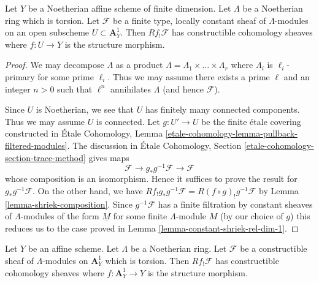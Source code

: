 \begin{lemma}
\label{lemma-loc-constant-shriek-rel-dim-1}
Let $Y$ be a Noetherian affine scheme of finite dimension.
Let $\Lambda$ be a Noetherian ring which is torsion.
Let $\mathcal{F}$ be a finite type, locally constant sheaf of
$\Lambda$-modules on an open subscheme $U \subset \mathbf{A}^1_Y$.
Then $Rf_!\mathcal{F}$ has constructible cohomology sheaves where
$f : U \to Y$ is the structure morphism.
\end{lemma}

\begin{proof}
We may decompose $\Lambda$ as a product
$\Lambda = \Lambda_1 \times \ldots \times \Lambda_r$
where $\Lambda_i$ is $\ell_i$-primary for some prime $\ell_i$.
Thus we may assume there exists a prime $\ell$ and an integer $n > 0$
such that $\ell^n$ annihilates $\Lambda$ (and hence $\mathcal{F}$).

\medskip\noindent
Since $U$ is Noetherian, we see that $U$ has finitely many connected
components. Thus we may assume $U$ is connected.
Let $g : U' \to U$ be the finite \'etale covering
constructed in \'Etale Cohomology, Lemma
\ref{etale-cohomology-lemma-pullback-filtered-modules}.
The discussion in
\'Etale Cohomology, Section \ref{etale-cohomology-section-trace-method}
gives maps
$$
\mathcal{F} \to g_*g^{-1}\mathcal{F} \to \mathcal{F}
$$
whose composition is an isomorphism. Hence it suffices to
prove the result for $g_*g^{-1}\mathcal{F}$. On the other hand,
we have $Rf_!g_*g^{-1}\mathcal{F} = R(f \circ g)_!g^{-1}\mathcal{F}$
by Lemma \ref{lemma-shriek-composition}.
Since $g^{-1}\mathcal{F}$ has a finite filtration by
constant sheaves of $\Lambda$-modules of the form
$\underline{M}$ for some finite $\Lambda$-module $M$
(by our choice of $g$) this reduces us to the case proved in
Lemma \ref{lemma-constant-shriek-rel-dim-1}.
\end{proof}

\begin{lemma}
\label{lemma-constructible-shriek-rel-dim-1}
Let $Y$ be an affine scheme. Let $\Lambda$ be a Noetherian ring.
Let $\mathcal{F}$ be a constructible sheaf of $\Lambda$-modules on
$\mathbf{A}^1_Y$ which is torsion. Then $Rf_!\mathcal{F}$ has constructible
cohomology sheaves where $f : \mathbf{A}^1_Y \to Y$ is the structure morphism.
\end{lemma}

